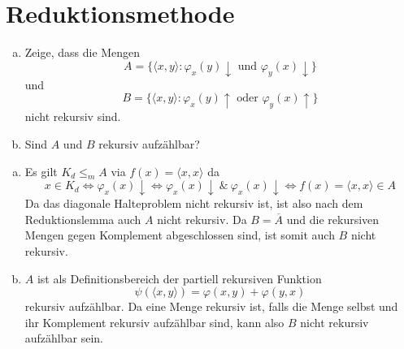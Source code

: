 \documentclass[german,headsepline]{scrartcl}
\begin{document}
	\section{Reduktionsmethode}
	\begin{question}[subtitle={Nachklausur 2012}]
		\begin{enumerate}[(a)]
			\item Zeige, dass die Mengen
				\[A=\{\langle x,y\rangle\colon\varphi_x(y)\downarrow\text{ und }\varphi_y(x)\downarrow\}\]
				und
				\[B=\{\langle x,y\rangle\colon\varphi_x(y)\uparrow\text{ oder }\varphi_y(x)\uparrow\}\]
				nicht rekursiv sind.
			\item Sind $A$ und $B$ rekursiv aufzählbar?
		\end{enumerate}
	\end{question}
	\begin{solution}
		\begin{enumerate}[(a)]
			\item Es gilt $K_d\leq_m A$ via $f(x)=\langle x,x\rangle$ da
				\[x\in K_d\Leftrightarrow\varphi_x(x)\downarrow\Leftrightarrow
				\varphi_x(x)\downarrow~\&~\varphi_x(x)\downarrow\Leftrightarrow
				f(x)=\langle x,x\rangle\in A\]
				Da das diagonale Halteproblem nicht rekursiv ist,
				ist also nach dem Reduktionslemma auch $A$ nicht rekursiv.
				Da $B=\overline{A}$ und die rekursiven Mengen gegen Komplement abgeschlossen sind,
				ist somit auch $B$ nicht rekursiv.
			\item $A$ ist als Definitionsbereich der partiell rekursiven Funktion
				\[\psi(\langle x,y\rangle)=\varphi(x,y)+\varphi(y,x)\]
				rekursiv aufzählbar.
				Da eine Menge rekursiv ist, falls die Menge selbst und ihr Komplement rekursiv aufzählbar sind,
				kann also $B$ nicht rekursiv aufzählbar sein.
		\end{enumerate}
	\end{solution}
	
\end{document}
